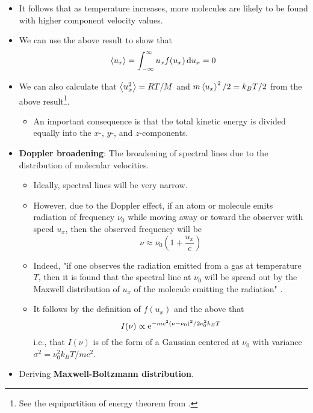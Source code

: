 \documentclass[../notes.tex]{subfiles}
\begin{document}
\begin{itemize}
\begin{itemize}
    \end{itemize}
    \item It follows that as temperature increases, more molecules are likely to be found with higher component velocity values.
    \item We can use the above result to show that
    \begin{equation*}
        \prb{u_x} = \int_{-\infty}^\infty u_xf(u_x)\dd{u_x} = 0
    \end{equation*}
    \item We can also calculate that $\prb{u_x^2}=RT/M$ and $m\prb{u_x}^2/2=k_BT/2$ from the above result\footnote{See the equipartition of energy theorem from \textcite{bib:PHYS13300Notes}.}.
    \begin{itemize}
        \item An important consequence is that the total kinetic energy is divided equally into the $x$-, $y$-, and $z$-components.
    \end{itemize}
    \item \textbf{Doppler broadening}: The broadening of spectral lines due to the distribution of molecular velocities.
    \begin{itemize}
        \item Ideally, spectral lines will be very narrow.
        \item However, due to the Doppler effect, if an atom or molecule emits radiation of frequency $\nu_0$ while moving away or toward the observer with speed $u_x$, then the observed frequency will be
        \begin{equation*}
            \nu \approx \nu_0\left( 1+\frac{u_x}{c} \right)
        \end{equation*}
        \item Indeed, "if one observes the radiation emitted from a gas at temperature $T$, then it is found that the spectral line at $\nu_0$ will be spread out by the Maxwell distribution of $u_x$ of the molecule emitting the radiation" \parencite[1021]{bib:McQuarrieSimon}.
        \item It follows by the definition of $f(u_x)$ and the above that
        \begin{equation*}
            I(\nu) \propto \e[-mc^2(\nu-\nu_0)^2/2\nu_0^2k_BT]
        \end{equation*}
        i.e., that $I(\nu)$ is of the form of a Gaussian centered at $\nu_0$ with variance $\sigma^2=\nu_0^2k_BT/mc^2$.
    \end{itemize}
    \item Deriving \textbf{Maxwell-Boltzmann distribution}.

\end{itemize}
\end{document}
